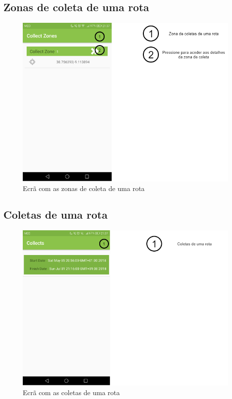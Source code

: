 \documentclass[10pt,a5paper]{article}
\begin{document}
\newpage
\subsection{Zonas de coleta de uma rota} 

\begin{figure}[!h]
	\centering
	\includegraphics[width=1.1\textwidth]{Images/screens/collect_zones_screen}
	\caption{Ecrã com as zonas de coleta de uma rota}
	\label{fig:collect_zones_screen}
\end{figure}

\newpage
\subsection{Coletas de uma rota} 

\begin{figure}[!h]
	\centering
	\includegraphics[width=1.1\textwidth]{Images/screens/route_collects}
	\caption{Ecrã com as coletas de uma rota}
	\label{fig:route_collects}
\end{figure}
\end{document}

